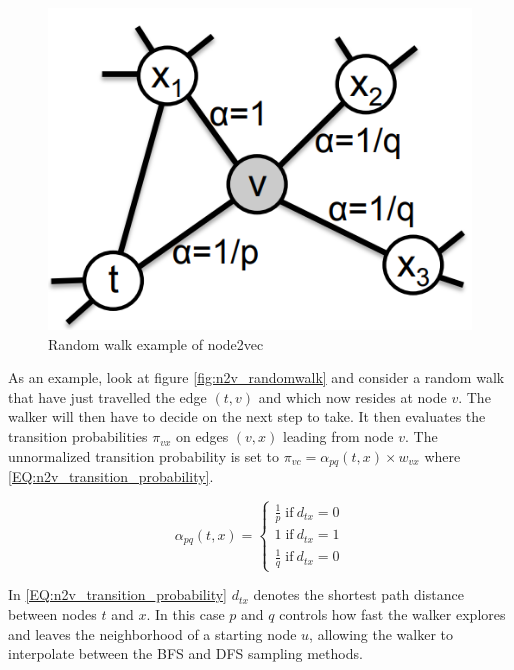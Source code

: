 \begin{figure}[H]
\centering
  \includegraphics[scale=0.5]{Article/figures/randomwalkexample.png}
  \caption{Random walk example of node2vec \cite{Node2vec}}
  \label{fig:n2v_randomwalk}
\end{figure}

As an example, look at figure \autoref{fig:n2v_randomwalk} and consider a random walk that have just travelled the edge $(t, v)$ and which now resides at node $v$. The walker will then have to decide on the next step to take. It then evaluates the transition probabilities $\pi_{vx}$ on edges $(v,x)$ leading from node $v$. The unnormalized transition probability is set to $\pi_{vc} = \alpha_{pq} (t,x) \times w_{vx}$ where \autoref{EQ:n2v_transition_probability}.

\begin{equation}\label{EQ:n2v_transition_probability}
\alpha_{pq} (t,x) =
\begin{cases} 
	\frac{1}{p} \; \text{if} \:  d_{tx} = 0 \\
	1 \; \text{if} \: d_{tx} = 1 \\
	\frac{1}{q} \; \text{if} \: d_{tx} = 0
\end{cases}
\end{equation}

In \autoref{EQ:n2v_transition_probability} $d_{tx}$ denotes the shortest path distance between nodes $t$ and $x$. In this case $p$ and $q$ controls how fast the walker explores and leaves the neighborhood of a starting node $u$, allowing the walker to interpolate between the BFS and DFS sampling methods.

